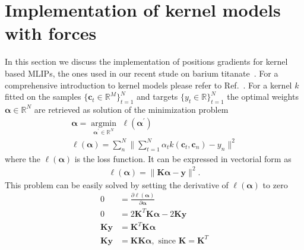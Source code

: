 \section{Implementation of kernel models with forces}
In this section we discuss the implementation of positions gradients for kernel based MLIPs, the ones used in our recent stude on barium titanate~\cite{gigli2023modeling}.
For a comprehensive introduction to kernel models please refer to Ref.~\cite{bishop2006pattern}. For a kernel $k$ fitted on the samples $\{\mathbf{c}_t\in\mathbb{R}^M\}_{t=1}^N$ and targets $\{y_t\in\mathbb{R}\}_{t=1}^N$ the optimal weights $\boldsymbol{\alpha}\in\mathbb{R}^N$ are retrieved as solution of the minimization problem
\begin{subequations}
  \label{eq:minkernel}
  \begin{gather}
    \boldsymbol{\alpha} = \underset{\boldsymbol{\alpha}^\prime\in\mathbb{R}^N}{{\operatorname{argmin}}}\,\, \ell(\boldsymbol{\alpha}^\prime)\\
    \ell(\boldsymbol{\alpha}) = \sum_{n}^N\| \sum_{t=1}^N \alpha_t k(\mathbf{c}_t, \mathbf{c}_{n}) - y_{n}\|^2
  \end{gather}
\end{subequations}
where the $\ell(\boldsymbol{\alpha})$ is the loss function.
It can be expressed in vectorial form as
\begin{subequations}
  \label{eq:minkernel}
  \begin{align}
    \ell(\boldsymbol{\alpha}) = \|\mathbf{K}\boldsymbol{\alpha} - \mathbf{y}\|^2.
  \end{align}
\end{subequations}
This problem can be easily solved by setting the derivative of $\ell(\boldsymbol{\alpha})$ to zero
\begin{subequations}
  \label{eq:solving_kernel}
  \begin{align}
    0 &= \frac{\partial \ell(\boldsymbol{\alpha})}{\partial\boldsymbol{\alpha}}\\
    0 &= 2\mathbf{K}^T\mathbf{K}\boldsymbol{\alpha} - 2\mathbf{K}\mathbf{y}\\
    \mathbf{K}\mathbf{y} &= \mathbf{K}^T\mathbf{K}\boldsymbol{\alpha}\\
    \mathbf{K}\mathbf{y} &= \mathbf{K}\mathbf{K}\boldsymbol{\alpha},\textrm{ since $\mathbf{K} = \mathbf{K}^T$} \label{eq:kernel_symmetry}
  \end{align}
\end{subequations}
